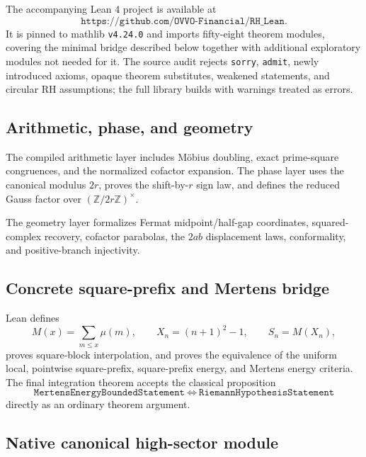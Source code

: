 \documentclass[11pt]{article}
\theoremstyle{definition}
\theoremstyle{remark}
\newcommand{\1}{\mathbf{1}}
\begin{document}
The accompanying Lean 4 project is available at
\[
 \texttt{https://github.com/OVVO-Financial/RH\_Lean}.
\]
It is pinned to mathlib \texttt{v4.24.0} and imports fifty-eight theorem modules, covering the minimal bridge described below together with additional exploratory modules not needed for it.  The source audit rejects \texttt{sorry}, \texttt{admit}, newly introduced axioms, opaque theorem substitutes, weakened statements, and circular RH assumptions; the full library builds with warnings treated as errors.

\subsection{Arithmetic, phase, and geometry}

The compiled arithmetic layer includes M\"obius doubling, exact prime-square congruences, and the normalized cofactor expansion.  The phase layer uses the canonical modulus $2r$, proves the shift-by-$r$ sign law, and defines the reduced Gauss factor over $(\mathbb Z/2r\mathbb Z)^\times$.

The geometry layer formalizes Fermat midpoint/half-gap coordinates, squared-complex recovery, cofactor parabolas, the $2ab$ displacement laws, conformality, and positive-branch injectivity.

\subsection{Concrete square-prefix and Mertens bridge}

Lean defines
\[
 M(x)=\sum_{m\le x}\mu(m),
 \qquad
 X_n=(n+1)^2-1,
 \qquad
 S_n=M(X_n),
\]
proves square-block interpolation, and proves the equivalence of the uniform local, pointwise square-prefix, square-prefix energy, and Mertens energy criteria.  The final integration theorem accepts the classical proposition
\[
 \texttt{MertensEnergyBoundedStatement}
 \ \Longleftrightarrow\ 
 \texttt{RiemannHypothesisStatement}
\]
directly as an ordinary theorem argument.

\subsection{Native canonical high-sector module}
\end{document}
